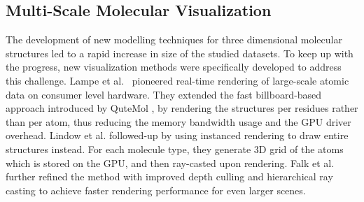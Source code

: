 \documentclass[review,journal]{vgtc}         %
\begin{document}
	
		
	\subsection{Multi-Scale Molecular Visualization}
	
	The development of new modelling techniques for three dimensional molecular structures led to a rapid increase in size of the studied datasets.
	To keep up with the progress, new visualization methods were specifically developed to address this challenge.
	Lampe et al.~\cite{lampe2007two} pioneered real-time rendering of large-scale atomic data on consumer level hardware. 
	They extended the fast billboard-based approach introduced by QuteMol \cite{tarini2006ambient}, by rendering the structures per residues rather than per atom, thus reducing the memory bandwidth usage and the GPU driver overhead. 
	Lindow et al. \cite{lindow2012interactive} followed-up by using  instanced rendering to draw entire structures instead.
	For each molecule type, they generate 3D grid of the atoms which is stored on the GPU, and then ray-casted upon rendering.
	Falk et al. \cite{falk2013atomistic} further refined the method with improved depth culling and hierarchical ray casting to achieve faster rendering performance for even larger scenes. \\
	
\end{document}
